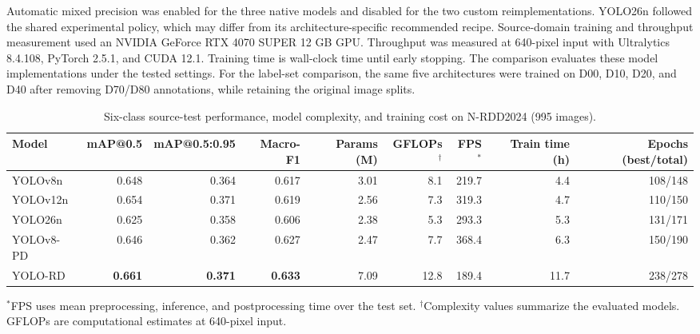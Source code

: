 \documentclass[conference]{IEEEtran}
\newif\ifdistractoranalysis \distractoranalysistrue %
\begin{document}
Automatic mixed precision was enabled for the three native models and disabled for the two custom reimplementations. YOLO26n followed the shared experimental policy, which may differ from its architecture-specific recommended recipe. Source-domain training and throughput measurement used an NVIDIA GeForce RTX 4070 SUPER 12 GB GPU. Throughput was measured at 640-pixel input with Ultralytics 8.4.108, PyTorch 2.5.1, and CUDA 12.1. Training time is wall-clock time until early stopping. The comparison evaluates these model implementations under the tested settings.
\ifdistractoranalysis For the label-set comparison, the same five architectures were trained on D00, D10, D20, and D40 after removing D70/D80 annotations, while retaining the original image splits.\fi

\begin{table}[!t]
\centering
\caption{Six-class source-test performance, model complexity, and training cost on N-RDD2024 (995 images).}
\label{tab:source}
\footnotesize
\setlength{\tabcolsep}{6pt}
\begin{tabular}{lrrrrrrrr}
\toprule
Model & mAP@0.5 & mAP@0.5:0.95 & Macro-F1 & Params (M) & GFLOPs$^{\dagger}$ & FPS$^{*}$ & Train time (h) & Epochs (best/total) \\
\midrule
YOLOv8n    & 0.648 & 0.364 & 0.617 & 3.01 & 8.1  & 219.7 & 4.4 & 108/148 \\
YOLOv12n   & 0.654 & 0.371 & 0.619 & 2.56 & 7.3  & 319.3 & 4.7 & 110/150 \\
YOLO26n    & 0.625 & 0.358 & 0.606 & 2.38 & 5.3  & 293.3 & 5.3 & 131/171 \\
YOLOv8-PD  & 0.646 & 0.362 & 0.627 & 2.47 & 7.7  & 368.4 & 6.3 & 150/190 \\
YOLO-RD    & \textbf{0.661} & \textbf{0.371} & \textbf{0.633} & 7.09 & 12.8 & 189.4 & 11.7 & 238/278 \\
\bottomrule
\end{tabular}
\par\smallskip
{\scriptsize $^{*}$FPS uses mean preprocessing, inference, and postprocessing time over the test set. $^{\dagger}$Complexity values summarize the evaluated models. GFLOPs are computational estimates at 640-pixel input.\par}
\end{table}
\end{document}
